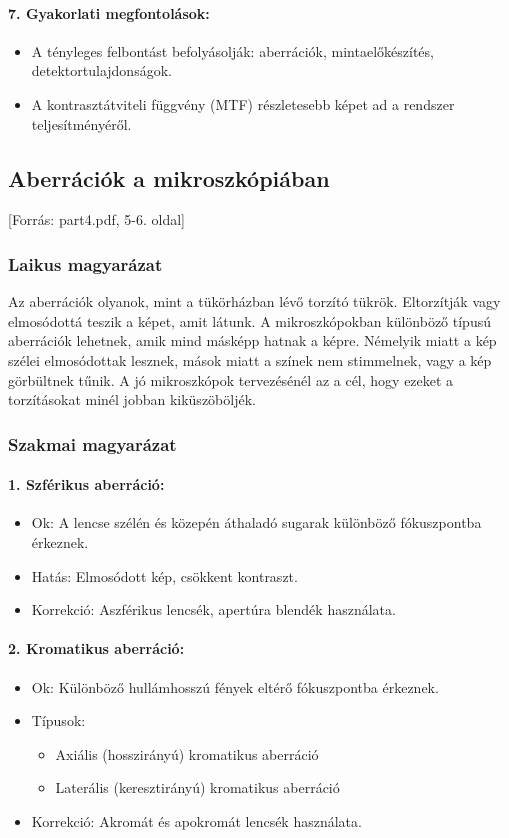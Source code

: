 \documentclass[a4paper,12pt]{article}
\begin{document}
\paragraph{7. Gyakorlati megfontolások:} \begin{itemize} \item A tényleges felbontást befolyásolják: aberrációk, mintaelőkészítés, detektortulajdonságok. \item A kontrasztátviteli függvény (MTF) részletesebb képet ad a rendszer teljesítményéről. \end{itemize}

\subsection{Aberrációk a mikroszkópiában} [Forrás: part4.pdf, 5-6. oldal]

\subsubsection{Laikus magyarázat} Az aberrációk olyanok, mint a tükörházban lévő torzító tükrök. Eltorzítják vagy elmosódottá teszik a képet, amit látunk. A mikroszkópokban különböző típusú aberrációk lehetnek, amik mind másképp hatnak a képre. Némelyik miatt a kép szélei elmosódottak lesznek, mások miatt a színek nem stimmelnek, vagy a kép görbültnek tűnik. A jó mikroszkópok tervezésénél az a cél, hogy ezeket a torzításokat minél jobban kiküszöböljék.

\subsubsection{Szakmai magyarázat}

\paragraph{1. Szférikus aberráció:} \begin{itemize} \item Ok: A lencse szélén és közepén áthaladó sugarak különböző fókuszpontba érkeznek. \item Hatás: Elmosódott kép, csökkent kontraszt. \item Korrekció: Aszférikus lencsék, apertúra blendék használata. \end{itemize}

\paragraph{2. Kromatikus aberráció:} \begin{itemize} \item Ok: Különböző hullámhosszú fények eltérő fókuszpontba érkeznek. \item Típusok: \begin{itemize} \item Axiális (hosszirányú) kromatikus aberráció \item Laterális (keresztirányú) kromatikus aberráció \end{itemize} \item Korrekció: Akromát és apokromát lencsék használata. \end{itemize}
\end{document}
